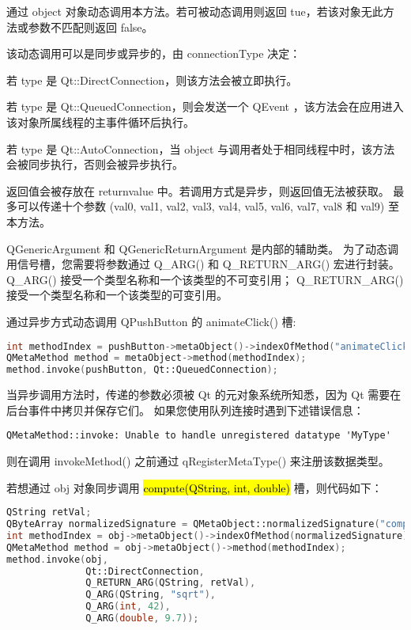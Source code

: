 通过 object 对象动态调用本方法。若可被动态调用则返回 tue，若该对象无此方法或参数不匹配则返回 false。

该动态调用可以是同步或异步的，由 connectionType 决定：

\begin{compactitem}
\item 若 type 是 Qt::DirectConnection，则该方法会被立即执行。
\item 若 type 是 Qt::QueuedConnection，则会发送一个 QEvent ，该方法会在应用进入该对象所属线程的主事件循环后执行。
\item 若 type 是 Qt::AutoConnection，当 object 与调用者处于相同线程中时，该方法会被同步执行，否则会被异步执行。
\end{compactitem}

返回值会被存放在 returnvalue 中。若调用方式是异步，则返回值无法被获取。
最多可以传递十个参数 (val0, val1, val2, val3, val4, val5, val6, val7, val8 和 val9) 至本方法。

QGenericArgument 和 QGenericReturnArgument 是内部的辅助类。
为了动态调用信号槽，您需要将参数通过 Q\_ARG() 和 Q\_RETURN\_ARG() 宏进行封装。
Q\_ARG() 接受一个类型名称和一个该类型的不可变引用；
Q\_RETURN\_ARG() 接受一个类型名称和一个该类型的可变引用。

通过异步方式动态调用 QPushButton 的 animateClick() 槽:

\begin{lstlisting}[language=C++]
int methodIndex = pushButton->metaObject()->indexOfMethod("animateClick()");
QMetaMethod method = metaObject->method(methodIndex);
method.invoke(pushButton, Qt::QueuedConnection);
\end{lstlisting}

当异步调用方法时，传递的参数必须被 Qt 的元对象系统所知悉，因为 Qt 需要在后台事件中拷贝并保存它们。
如果您使用队列连接时遇到下述错误信息：

\begin{lstlisting}
QMetaMethod::invoke: Unable to handle unregistered datatype 'MyType'	
\end{lstlisting}

则在调用 invokeMethod() 之前通过 qRegisterMetaType() 来注册该数据类型。

若想通过 obj 对象同步调用 \hl{compute(QString, int, double)} 槽，则代码如下：

\begin{lstlisting}[language=C++]
QString retVal;
QByteArray normalizedSignature = QMetaObject::normalizedSignature("compute(QString, int, double)");
int methodIndex = obj->metaObject()->indexOfMethod(normalizedSignature);
QMetaMethod method = obj->metaObject()->method(methodIndex);
method.invoke(obj,
              Qt::DirectConnection,
              Q_RETURN_ARG(QString, retVal),
              Q_ARG(QString, "sqrt"),
              Q_ARG(int, 42),
              Q_ARG(double, 9.7));
\end{lstlisting}


